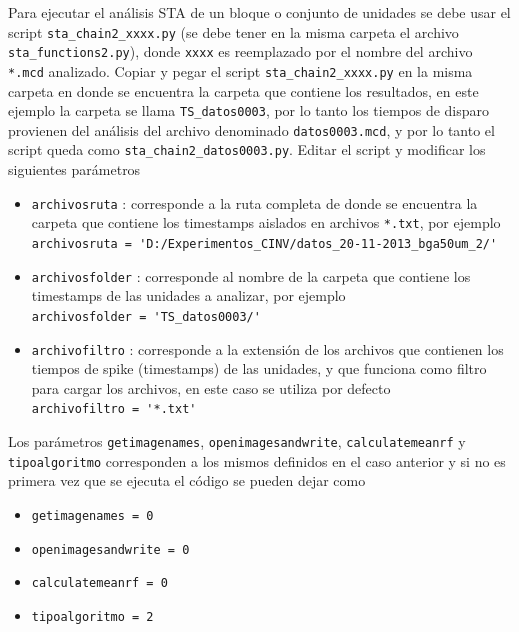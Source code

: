 \documentclass[10pt]{article}
\begin{document}
Para ejecutar el análisis STA de un bloque o conjunto de unidades se debe usar el script \verb+sta_chain2_xxxx.py+ (se debe tener en la misma carpeta el archivo \verb+sta_functions2.py+), donde \verb+xxxx+ es reemplazado por el nombre del archivo \verb+*.mcd+ analizado. 
Copiar y pegar el script \verb+sta_chain2_xxxx.py+ en la misma carpeta en donde se encuentra la carpeta que contiene los resultados, en este ejemplo la carpeta se llama \verb+TS_datos0003+, por lo tanto los tiempos de disparo provienen del análisis del archivo denominado \verb+datos0003.mcd+, y por lo tanto el script queda como \verb+sta_chain2_datos0003.py+. Editar el script y modificar los siguientes parámetros \\

\begin{itemize}
\item \verb+archivosruta+ : corresponde a la ruta completa de donde se encuentra la carpeta que contiene los timestamps aislados en archivos \verb+*.txt+, por ejemplo\\

\verb+archivosruta = 'D:/Experimentos_CINV/datos_20-11-2013_bga50um_2/'+ \\

\item \verb+archivosfolder+ : corresponde al nombre de la carpeta que contiene los timestamps de las unidades a analizar, por ejemplo \\

\verb+archivosfolder = 'TS_datos0003/'+ \\

\item \verb+archivofiltro+ : corresponde a la extensión de los archivos que contienen los tiempos de spike (timestamps) de las unidades, y que funciona como filtro para cargar los archivos, en este caso se utiliza por defecto \\

\verb+archivofiltro = '*.txt'+ \\
\end{itemize}

Los parámetros \verb+getimagenames+, \verb+openimagesandwrite+, \verb+calculatemeanrf+ y \verb+tipoalgoritmo+ corresponden a los mismos definidos en el caso anterior y si no es primera vez que se ejecuta el código se pueden dejar como \\
\begin{itemize}
\item \verb+getimagenames = 0+
\item \verb+openimagesandwrite = 0+
\item \verb+calculatemeanrf = 0 +
\item \verb+tipoalgoritmo = 2+
\end{itemize}
\end{document}
